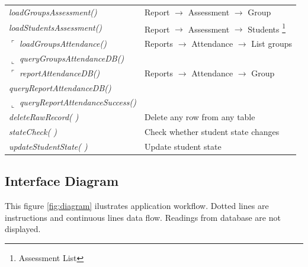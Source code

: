 \begin{bclogo}[couleur=orange!30,logo=\bcbook, arrondi=0.1,ombre=true ]
\begin{tabular}{ll}
\emph{ loadGroupsAssessment() }            & Report $\rightarrow$ Assessment $\rightarrow$  Group\\
\emph{ loadStudentsAssessment() }      & Report $\rightarrow$ Assessment $\rightarrow$   Students \footnote{Assessment List}\\

$\ulcorner$ \emph { loadGroupsAttendance()}         &{ Reports  $\rightarrow$ Attendance  $\rightarrow$ List  groups  } \\
$\llcorner$ \emph { queryGroupsAttendanceDB() }     &  \\

$\ulcorner$ \emph{ reportAttendanceDB()  }              & {  Reports $\rightarrow$  Attendance $\rightarrow$  Group }\\
\emph{ queryReportAttendanceDB() }          &  \\
$\llcorner$\emph{ queryReportAttendanceSuccess()}     &  \\

\emph { deleteRawRecord( ) }            & { Delete any row from any table } \\
\emph { stateCheck( )}                  &{ Check whether student state changes  }\\
\emph { updateStudentState( )}          &{ Update student state } \\

\end{tabular}
\end{bclogo}  

		\subsection{Interface Diagram}
		
		This figure \ref{fig:diagram} ilustrates application workflow. Dotted lines are instructions and continuous lines 
		data flow. Readings from database are not displayed. 
		
